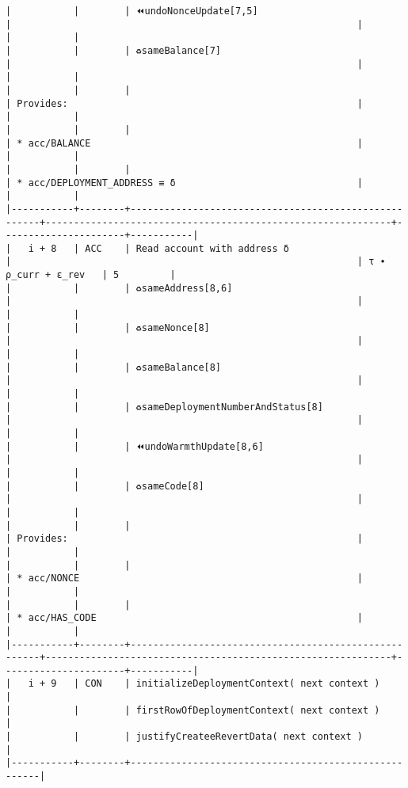 \documentclass[varwidth=\maxdimen,margin=0.5cm,multi={verbatim}]{standalone}
\begin{document}
\begin{verbatim}
|           |        | ⏪undoNonceUpdate[7,5]                               |                                                             |                      |           |
|           |        | ♻️sameBalance[7]                                     |                                                             |                      |           |
|           |        |                                                      | Provides:                                                   |                      |           |
|           |        |                                                      | * acc/BALANCE                                               |                      |           |
|           |        |                                                      | * acc/DEPLOYMENT_ADDRESS ≡ δ                                |                      |           |
|-----------+--------+------------------------------------------------------+-------------------------------------------------------------+----------------------+-----------|
|   i + 8   | ACC    | Read account with address δ                          |                                                             | τ ∙ ρ_curr + ε_rev   | 5         |
|           |        | ♻️sameAddress[8,6]                                   |                                                             |                      |           |
|           |        | ♻️sameNonce[8]                                       |                                                             |                      |           |
|           |        | ♻️sameBalance[8]                                     |                                                             |                      |           |
|           |        | ♻️sameDeploymentNumberAndStatus[8]                   |                                                             |                      |           |
|           |        | ⏪undoWarmthUpdate[8,6]                              |                                                             |                      |           |
|           |        | ♻️sameCode[8]                                        |                                                             |                      |           |
|           |        |                                                      | Provides:                                                   |                      |           |
|           |        |                                                      | * acc/NONCE                                                 |                      |           |
|           |        |                                                      | * acc/HAS_CODE                                              |                      |           |
|-----------+--------+------------------------------------------------------+-------------------------------------------------------------+----------------------+-----------|
|   i + 9   | CON    | initializeDeploymentContext( next context )          |
|           |        | firstRowOfDeploymentContext( next context )          |
|           |        | justifyCreateeRevertData( next context )             |
|-----------+--------+------------------------------------------------------|

\end{verbatim}
\end{document}
